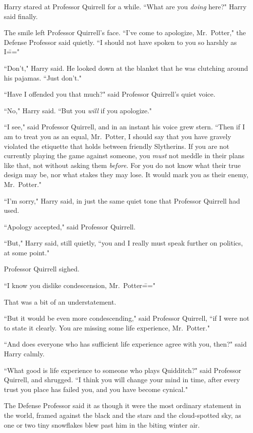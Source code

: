 Harry stared at Professor Quirrell for a while. ``What are you \emph{doing} here?" Harry said finally.

The smile left Professor Quirrell's face. ``I've come to apologize, Mr.~Potter," the Defense Professor said quietly. ``I should not have spoken to you so harshly as I\==="

``Don't," Harry said. He looked down at the blanket that he was clutching around his pajamas. ``Just don't."

``Have I offended you that much?" said Professor Quirrell's quiet voice.

``No," Harry said. ``But you \emph{will} if you apologize."

``I see," said Professor Quirrell, and in an instant his voice grew stern. ``Then if I am to treat you as an equal, Mr.~Potter, I should say that you have gravely violated the etiquette that holds between friendly Slytherins. If you are not currently playing the game against someone, you \emph{must} not meddle in their plans like that, not without asking them \emph{before}. For you do not know what their true design may be, nor what stakes they may lose. It would mark you as their enemy, Mr.~Potter."

``I'm sorry," Harry said, in just the same quiet tone that Professor Quirrell had used.

``Apology accepted," said Professor Quirrell.

``But," Harry said, still quietly, ``you and I really must speak further on politics, at some point."

Professor Quirrell sighed.

``I know you dislike condescension, Mr.~Potter\==="

That was a bit of an understatement.

``But it would be even more condescending," said Professor Quirrell, ``if I were not to state it clearly. You are missing some life experience, Mr.~Potter."

``And does everyone who has sufficient life experience agree with you, then?" said Harry calmly.

``What good is life experience to someone who plays Quidditch?" said Professor Quirrell, and shrugged. ``I think you will change your mind in time, after every trust you place has failed you, and you have become cynical."

The Defense Professor said it as though it were the most ordinary statement in the world, framed against the black and the stars and the cloud-spotted sky, as one or two tiny snowflakes blew past him in the biting winter air.


